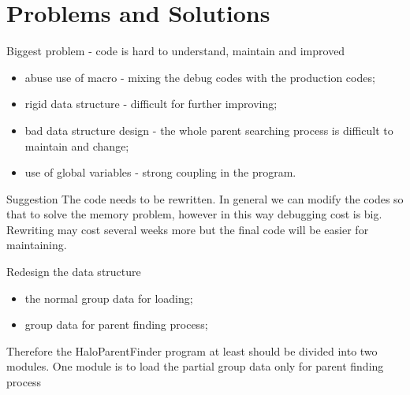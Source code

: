 \documentclass[notheorems, aspectratio=54]{beamer}
\begin{document}
\section{Problems and Solutions}
\begin{frame}

\begin{block}{Biggest problem - code is hard to understand, maintain and improved} 
 \begin{itemize}
  \item abuse use of macro - mixing the debug codes with the production codes;
  \item rigid data structure - difficult for further improving;
  \item bad data structure design - the whole parent searching process is difficult 
  to maintain and change;
  \item use of global variables - strong coupling in the program.
 \end{itemize}
\end{block}

\begin{block}{Suggestion}
 The code needs to be rewritten. In general we can modify the codes so that to solve the memory
 problem, however in this way debugging cost is big. Rewriting may cost several weeks more but
 the final code will be easier for maintaining.
\end{block}

 
\end{frame}

\begin{frame}

\begin{block}{Redesign the data structure}
 \begin{itemize}
  \item the normal group data for loading;
  \item group data for parent finding process;
 \end{itemize}
 Therefore the HaloParentFinder program at least should be divided into two modules. One module
 is to load the partial group data only for parent finding process
\end{block}

\end{frame}



\end{document}
